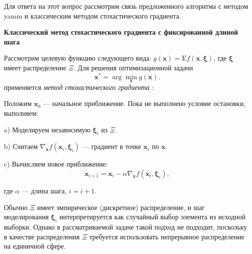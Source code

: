 Для ответа на этот вопрос рассмотрим связь предложенного алгоритма с методом yamm и классическим методом стохастического градиента.

\vspace{1ex}

\textbf{Классический метод стохастического градиента с фиксированной длиной шага}

Рассмотрим целевую функцию следующего вида: $g(\boldsymbol{x}) = \mathrm{E} f(\boldsymbol{x}, \boldsymbol{\xi})$, где $\boldsymbol{\xi}$ имеет распределение $\Xi$.  Для решения оптимизационной задачи
\begin{equation}\label{eq:stochast_grad}
\boldsymbol{x}^* = \arg\min_{\boldsymbol{x}} g(\boldsymbol{x}).
\end{equation}
применяется \emph{метод стохастического градиента} \cite{RobbinsMonro1951}:

\begin{algorithm}[H]
\caption{Метод стохастического градиента}
\begin{algorithmic}[1]
    \State Положим $\boldsymbol{x}_0$ --- начальное приближение.
    \State Пока не выполнено условие остановки, выполняем:
        \item[] \hspace{\algorithmicindent} a) Моделируем независимую $\boldsymbol{\xi}_i$ из $\Xi$.
        \item[] \hspace{\algorithmicindent} b) Считаем $\nabla_{\boldsymbol{x}} f(\boldsymbol{x}_i, \boldsymbol{\xi}_i)$ --- градиент в точке $\boldsymbol{x}_i$ по $\boldsymbol{x}$.
        \item[] \hspace{\algorithmicindent} c) Вычисляем новое приближение:
        \begin{equation}\label{eq:sg_it}
        \boldsymbol{x}_{i+1} =\boldsymbol{x}_i - \alpha \nabla_{\boldsymbol{x}} f(\boldsymbol{x}_i, \boldsymbol{\xi}_i),
        \end{equation}
        \item[] \hspace{\algorithmicindent} \phantom{c)} где $\alpha$ --- длина шага, $i = i + 1$.
\end{algorithmic}
\label{alg:stochgrad}
\end{algorithm}

Обычно $\Xi$ имеет эмпирическое (дискретное) распределение, и шаг моделирования $\boldsymbol{\xi}_i$ интерпретируется как случайный выбор элемента из исходной выборки. Однако в рассматриваемой задаче такой подход не подходит, поскольку в качестве распределения $\Xi$ требуется использовать непрерывное распределение на единичной сфере.

